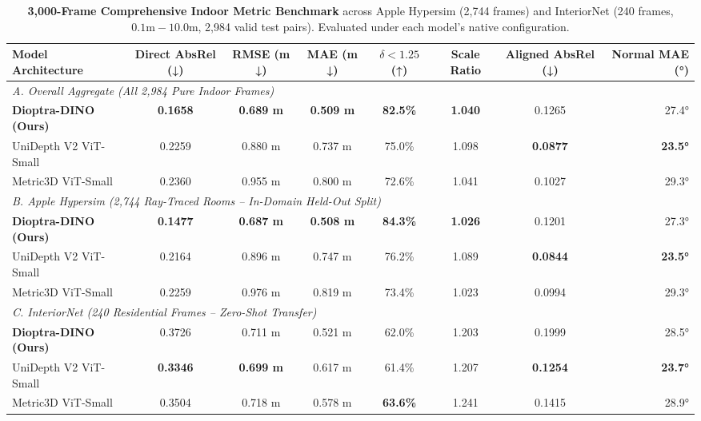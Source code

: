 \documentclass[10pt,twocolumn,letterpaper]{article}
\begin{document}
\begin{table}[t]
\centering
\caption{\textbf{3,000-Frame Comprehensive Indoor Metric Benchmark} across Apple Hypersim (2,744 frames) and InteriorNet (240 frames, $0.1\text{m} - 10.0\text{m}$, 2,984 valid test pairs). Evaluated under each model's native configuration.}
\label{tab:pure_indoor_3000}
\small
\begin{tabular}{lccccccr}
\toprule
\textbf{Model Architecture} & \textbf{Direct AbsRel (↓)} & \textbf{RMSE (m ↓)} & \textbf{MAE (m ↓)} & \textbf{$\delta < 1.25$ (↑)} & \textbf{Scale Ratio} & \textbf{Aligned AbsRel (↓)} & \textbf{Normal MAE (°)} \\
\midrule
\multicolumn{8}{l}{\textit{A. Overall Aggregate (All 2,984 Pure Indoor Frames)}} \\
\textbf{Dioptra-DINO (Ours)} & \textbf{0.1658} & \textbf{0.689 m} & \textbf{0.509 m} & \textbf{82.5\%} & \textbf{1.040} & 0.1265 & 27.4° \\
UniDepth V2 ViT-Small \cite{piccinelli2024unidepth} & 0.2259 & 0.880 m & 0.737 m & 75.0\% & 1.098 & \textbf{0.0877} & \textbf{23.5°} \\
Metric3D ViT-Small \cite{yin2023metric3d} & 0.2360 & 0.955 m & 0.800 m & 72.6\% & 1.041 & 0.1027 & 29.3° \\
\midrule
\multicolumn{8}{l}{\textit{B. Apple Hypersim (2,744 Ray-Traced Rooms -- In-Domain Held-Out Split)}} \\
\textbf{Dioptra-DINO (Ours)} & \textbf{0.1477} & \textbf{0.687 m} & \textbf{0.508 m} & \textbf{84.3\%} & \textbf{1.026} & 0.1201 & 27.3° \\
UniDepth V2 ViT-Small \cite{piccinelli2024unidepth} & 0.2164 & 0.896 m & 0.747 m & 76.2\% & 1.089 & \textbf{0.0844} & \textbf{23.5°} \\
Metric3D ViT-Small \cite{yin2023metric3d} & 0.2259 & 0.976 m & 0.819 m & 73.4\% & 1.023 & 0.0994 & 29.3° \\
\midrule
\multicolumn{8}{l}{\textit{C. InteriorNet (240 Residential Frames -- Zero-Shot Transfer)}} \\
\textbf{Dioptra-DINO (Ours)} & 0.3726 & 0.711 m & 0.521 m & 62.0\% & 1.203 & 0.1999 & 28.5° \\
UniDepth V2 ViT-Small \cite{piccinelli2024unidepth} & \textbf{0.3346} & \textbf{0.699 m} & 0.617 m & 61.4\% & 1.207 & \textbf{0.1254} & \textbf{23.7°} \\
Metric3D ViT-Small \cite{yin2023metric3d} & 0.3504 & 0.718 m & 0.578 m & \textbf{63.6\%} & 1.241 & 0.1415 & 28.9° \\
\bottomrule
\end{tabular}
\end{table}
\end{document}
